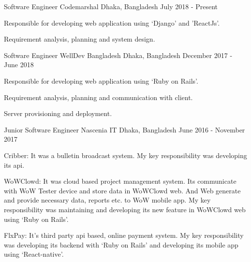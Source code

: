 \begin{cventries}

\cventry
    {Software Engineer}
    {Codemarshal}
    {Dhaka, Bangladesh}
    {July 2018 - Present}
    {
      \begin{cvitems}[Responsibilities:]
        \item {Responsible for developing web application using ‘Django’ and 'ReactJs'.}
        \vspace{1mm}
        \item {Requirement analysis, planning and system design.}
      \end{cvitems}
    }

\cventry
    {Software Engineer}
    {WellDev Bangladesh}
    {Dhaka, Bangladesh}
    {December 2017 - June 2018}
    {
      \begin{cvitems}[Responsibilities:]
        \item {Responsible for developing web application using ‘Ruby on Rails’.}
        \vspace{1mm}
        \item {Requirement analysis, planning and communication with client.}
        \vspace{1mm}
        \item {Server provisioning and deployment.}
      \end{cvitems}
    }

\cventry
    {Junior Software Engineer}
    {Nascenia IT}
    {Dhaka, Bangladesh}
    {June 2016 - November 2017}
    {
      \begin{cvitems}[Projects:]
        \vspace{1mm}
        \item {Cribber: It was a bulletin broadcast system. My key responsibility was developing its api.}
        \vspace{1mm}
        \item {WoWClowd: It was cloud based project management system. Its communicate with WoW Tester device and store data in WoWClowd web. And Web generate and provide necessary data, reports etc. to WoW mobile app. My key responsibility was maintaining and developing its new feature in WoWClowd web using  ‘Ruby on Rails’.
        \vspace{1mm}
}
        \item {FlxPay:  It’s third party api based, online payment system. My key responsibility was developing its backend with ‘Ruby on Rails’ and developing its mobile app using ‘React-native’.}
      \end{cvitems}
    }
\end{cventries}
